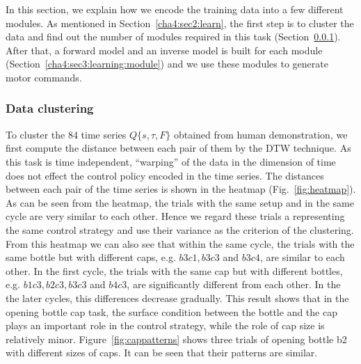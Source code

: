 In this section, we explain how we encode the training data into a few different modules. As mentioned in Section~\ref{cha4:sec2:learn}, the first step is to cluster the data and find out the number of modules required in this task (Section~\ref{cha4:sec3:learning:clustering}). After that, a forward model and an inverse model is built for each module (Section~\ref{cha4:sec3:learning:module}) and we use these modules to generate motor commands.

\subsubsection{Data clustering}
\label{cha4:sec3:learning:clustering}
To cluster the 84 time series $Q\{s,\tau,F\}$ obtained from human demonstration, we first compute the distance between each pair of them by the DTW technique. As this task is time independent, ``warping'' of the data in the dimension of time does not effect the control policy encoded in the time series. The distances between each pair of the time series is shown in the heatmap (Fig.~\ref{fig:heatmap}). As can be seen from the heatmap, the trials with the same setup and in the same cycle are very similar to each other. Hence we regard these trials a representing the same control strategy and use their variance as the criterion of the clustering. From this heatmap we can also see that within the same cycle, the trials with the same bottle but with different caps, e.g. $b3c1, b3c3$ and $b3c4$, are similar to each other. In the first cycle, the trials with the same cap but with different bottles, e.g. $b1c3, b2c3, b3c3$ and $b4c3$, are significantly different from each other. In the the later cycles, this differences decrease gradually. This result shows that in the opening bottle cap task, the surface condition between the bottle and the cap plays an important role in the control strategy, while the role of cap size is relatively minor. Figure~\ref{fig:cappatterns} shows three trials of opening bottle b2 with different sizes of caps. It can be seen that their patterns are similar.


